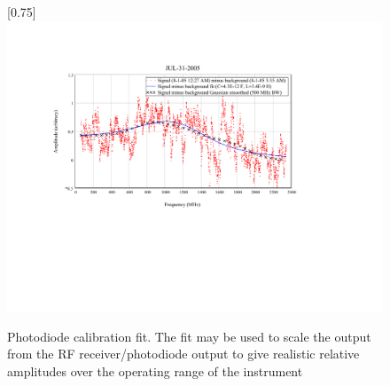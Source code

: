 \begin{figure}
\scalebox{0.75}[0.75]{
\includegraphics*[bb=94 217 611 521]
{PD_fit/PD_fit.pdf}
}
\caption[Photodiode calibration fit]{Photodiode calibration fit. The fit may be used to scale the output from the RF receiver/photodiode output to give realistic relative amplitudes over the operating range of the instrument}
\label{PD_fit}
\end{figure}
